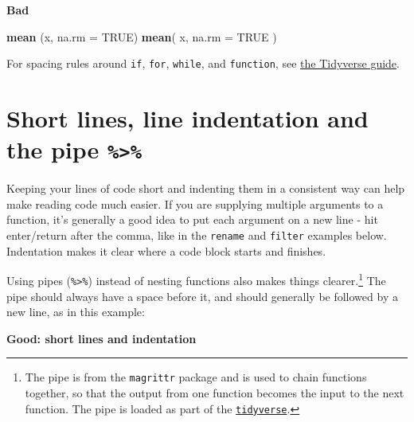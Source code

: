 \documentclass[]{book}
\newenvironment{Shaded}{\begin{snugshade}}{\end{snugshade}}
\newcommand{\DataTypeTok}[1]{\textcolor[rgb]{0.13,0.29,0.53}{#1}}
\newcommand{\DecValTok}[1]{\textcolor[rgb]{0.00,0.00,0.81}{#1}}
\newcommand{\KeywordTok}[1]{\textcolor[rgb]{0.13,0.29,0.53}{\textbf{#1}}}
\newcommand{\NormalTok}[1]{#1}
\newcommand{\OperatorTok}[1]{\textcolor[rgb]{0.81,0.36,0.00}{\textbf{#1}}}
\newcommand{\OtherTok}[1]{\textcolor[rgb]{0.56,0.35,0.01}{#1}}
\newcommand{\StringTok}[1]{\textcolor[rgb]{0.31,0.60,0.02}{#1}}
\begin{document}
\textbf{Bad}

\begin{Shaded}
\begin{Highlighting}[]
\KeywordTok{mean}\NormalTok{ (x, }\DataTypeTok{na.rm =} \OtherTok{TRUE}\NormalTok{)}
\KeywordTok{mean}\NormalTok{( x, }\DataTypeTok{na.rm =} \OtherTok{TRUE}\NormalTok{ )}
\end{Highlighting}
\end{Shaded}

For spacing rules around \texttt{if}, \texttt{for}, \texttt{while}, and \texttt{function}, see \href{https://style.tidyverse.org/syntax.html\#parentheses}{the Tidyverse guide}.

\hypertarget{short-lines-line-indentation-and-the-pipe}{%
\section{\texorpdfstring{Short lines, line indentation and the pipe \texttt{\%\textgreater{}\%}}{Short lines, line indentation and the pipe \%\textgreater{}\%}}\label{short-lines-line-indentation-and-the-pipe}}

Keeping your lines of code short and indenting them in a consistent way can help make reading code much easier. If you are supplying multiple arguments to a function, it's generally a good idea to put each argument on a new line - hit enter/return after the comma, like in the \texttt{rename} and \texttt{filter} examples below. Indentation makes it clear where a code block starts and finishes.

Using pipes (\texttt{\%\textgreater{}\%}) instead of nesting functions also makes things clearer.\footnote{The pipe is from the \texttt{magrittr} package and is used to chain functions together, so that the output from one function becomes the input to the next function. The pipe is loaded as part of the \protect\hyperlink{tidyverse}{\texttt{tidyverse}}.} The pipe should always have a space before it, and should generally be followed by a new line, as in this example:

\textbf{Good: short lines and indentation}

\begin{Shaded}
\end{Shaded}
\end{document}
